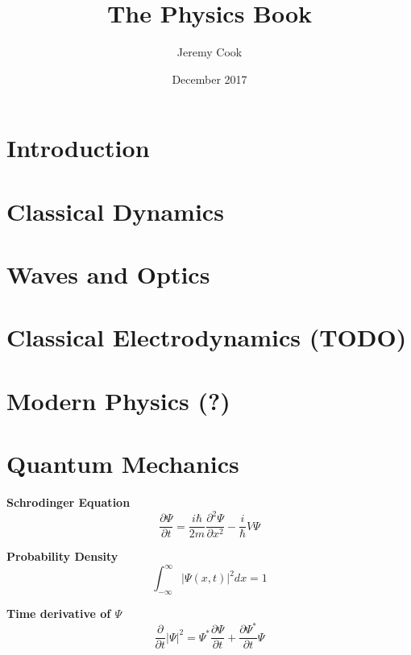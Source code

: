 \documentclass{article}
\title{The Physics Book}
\author{Jeremy Cook}
\date{December 2017}
\begin{document}
\maketitle

\tableofcontents
\newpage

\section{Introduction}

\newpage
\section{Classical Dynamics}

\newpage
\section{Waves and Optics}

\newpage
\section{Classical Electrodynamics (TODO)}

\newpage
\section{Modern Physics (?)}

\newpage
\section{Quantum Mechanics}

\noindent \textbf{Schrodinger Equation} \\

\begin{equation}
    \frac{\partial \Psi}{\partial t} = \frac{i\hbar}{2m}\frac{\partial^2 \Psi}{\partial x^2} - \frac{i}{\hbar}V\Psi
\end{equation}

\noindent \textbf{Probability Density} \\
\begin{equation}
    \int_{-\infty}^{\infty} |\Psi (x,t)|^2 dx = 1
\end{equation}

\noindent \textbf{Time derivative of $\Psi$} \\

\begin{equation}
    \frac{\partial}{\partial t} |\Psi |^2 = \Psi^{*}\frac{\partial \Psi}{\partial t} + \frac{\partial \Psi^{*}}{\partial t}\Psi \label{t1}
\end{equation}
\end{document}
